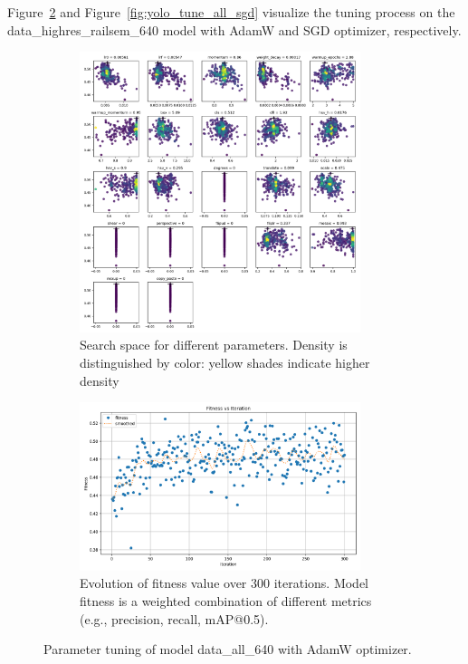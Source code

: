 \documentclass[Master,MDS,english]{BASE/twbook} %
\begin{document}
Figure~\ref{fig:yolo_tune_all_adam} and Figure~\ref{fig:yolo_tune_all_sgd} visualize the tuning process on the data\_highres\_railsem\_640 model  with AdamW and SGD optimizer, respectively.

\begin{figure}
\centering
\begin{subfigure}{.5\textwidth}
  \centering
  \includegraphics[width=0.9\textwidth]{images/yolo/all/adam/tune_scatter_plots}
  \caption{Search space for different parameters. Density is distinguished by color: yellow shades indicate higher density}
\end{subfigure}%
\begin{subfigure}{.5\textwidth}
  \centering
  \includegraphics[width=0.9\textwidth]{images/yolo/all/adam/tune_fitness}
  \caption{Evolution of fitness value over 300 iterations. Model fitness is a weighted combination of different metrics (e.g., precision, recall, mAP@0.5).}
  \label{fig:images_from_videos}
\end{subfigure}
\caption{Parameter tuning of model data\_all\_640 with AdamW optimizer.}
\label{fig:yolo_tune_all_adam}
\end{figure}
\end{document}
